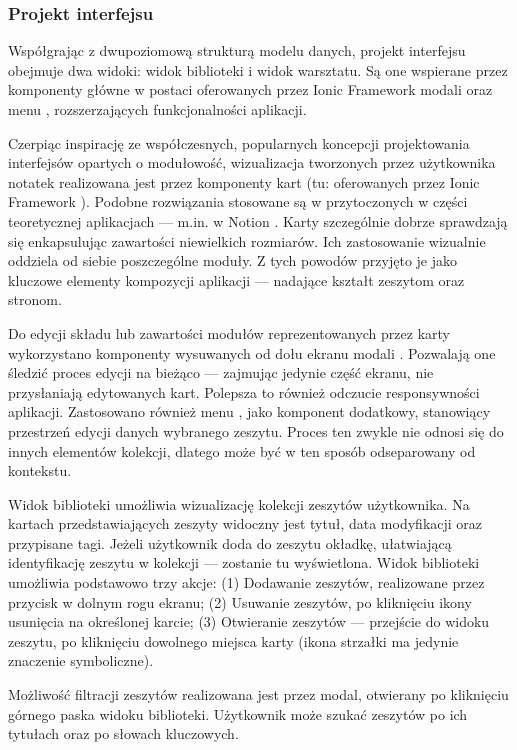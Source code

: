 \subsubsection{Projekt interfejsu}
Współgrając z dwupoziomową strukturą modelu danych, projekt interfejsu obejmuje dwa widoki: widok biblioteki i widok warsztatu.
Są one wspierane przez komponenty główne w postaci oferowanych przez Ionic Framework modali oraz menu \cite{ionic},
rozszerzających funkcjonalności aplikacji.

Czerpiąc inspirację ze współczesnych, popularnych koncepcji projektowania interfejsów
opartych o modułowość, wizualizacja tworzonych przez użytkownika notatek realizowana jest przez komponenty
kart (tu: oferowanych przez Ionic Framework \cite{ionic}). Podobne rozwiązania stosowane są w przytoczonych
w części teoretycznej
aplikacjach — m.in. w Notion \cite{notion}.
Karty szczególnie dobrze sprawdzają się enkapsulując zawartości niewielkich rozmiarów.
Ich zastosowanie wizualnie oddziela od siebie poszczególne moduły.
Z tych powodów przyjęto je jako kluczowe elementy kompozycji aplikacji — nadające kształt zeszytom oraz stronom.

Do edycji składu lub zawartości modułów reprezentowanych przez karty wykorzystano komponenty wysuwanych od dołu ekranu modali \cite{ionic}.
Pozwalają one śledzić proces edycji na bieżąco — zajmując jedynie część ekranu, nie przysłaniają edytowanych kart.
Polepsza to również odczucie responsywności aplikacji.
Zastosowano również menu \cite{ionic}, jako komponent dodatkowy, stanowiący przestrzeń edycji danych wybranego zeszytu. Proces ten zwykle
nie odnosi się do innych elementów kolekcji, dlatego może być w ten sposób odseparowany od kontekstu.

Widok biblioteki umożliwia wizualizację kolekcji zeszytów użytkownika. Na kartach przedstawiających zeszyty widoczny jest tytuł,
data modyfikacji oraz przypisane tagi. Jeżeli użytkownik doda do zeszytu okładkę, ułatwiającą identyfikację zeszytu w kolekcji — zostanie
tu wyświetlona. Widok biblioteki umożliwia podstawowo trzy akcje: (1) Dodawanie zeszytów, realizowane przez przycisk w dolnym rogu ekranu;
(2) Usuwanie zeszytów, po kliknięciu ikony usunięcia \cite{ionic} na określonej karcie;
(3) Otwieranie zeszytów — przejście do widoku zeszytu, po kliknięciu dowolnego miejsca karty (ikona strzałki \cite{ionic}
ma jedynie znaczenie symboliczne).

Możliwość filtracji zeszytów realizowana jest przez modal, otwierany po kliknięciu górnego paska widoku biblioteki.
Użytkownik może szukać zeszytów po ich tytułach oraz po słowach kluczowych.

